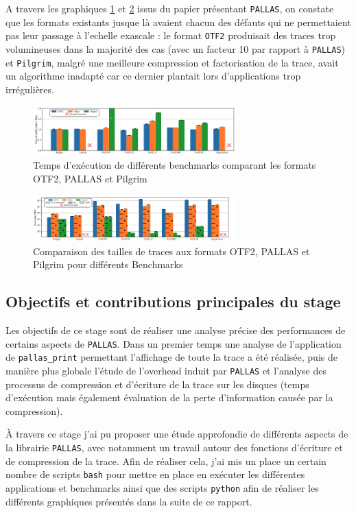 A travers les graphiques \ref{fig:time} et \ref{fig:size} issus du papier présentant \verb!PALLAS!\cite{pallas_ipdps}, on constate que les formats existants jusque là avaient chacun des défauts
qui ne permettaient pas leur passage à l'echelle exascale : le format \verb!OTF2! produisait des traces trop volumineuses dans la majorité des cas (avec un facteur 10 par rapport à \verb!PALLAS!)
et \verb!Pilgrim!, malgré une meilleure compression et factorisation de la trace, avait un algorithme inadapté car ce dernier plantait lors d'applications trop irrégulières.
\begin{figure}[!h]
    \centering
    \includegraphics[width=0.7\textwidth]{img/exec_time.png}
    \caption{Temps d'exécution de différents benchmarks comparant les formats OTF2, PALLAS et Pilgrim}
    \label{fig:time}
\end{figure}

\begin{figure}[!h]
    \centering
    \includegraphics[width=0.7\textwidth]{img/trace_size.png}
    \caption{Comparaison des tailles de traces aux formats OTF2, PALLAS et Pilgrim pour différents Benchmarks}
    \label{fig:size}
\end{figure}


\subsection{Objectifs et contributions principales du stage}\label{ssec:introduction_objectifs}

Les objectifs de ce stage sont de réaliser une analyse précise des performances de certains aspects de \verb!PALLAS!. Dans un premier temps une analyse de l'application de \verb!pallas_print! permettant
l'affichage de toute la trace a été réalisée, puis de manière plus globale l'étude de l'overhead induit par \verb!PALLAS! et l'analyse des processus de compression et d'écriture de la trace sur les disques (temps d'exécution mais 
également évaluation de la perte d'information causée par la compression). 

À travers ce stage j'ai pu proposer une étude approfondie de différents aspects de la librairie \verb!PALLAS!, avec notamment un travail autour des fonctions d'écriture et de compression
de la trace.
Afin de réaliser cela, j'ai mis un place un certain nombre de scripts \verb!bash! pour mettre en place en exécuter les différentes applications et benchmarks ainsi que des 
scripts \verb!python! afin de réaliser les différents graphiques présentés dans la suite de ce rapport.

